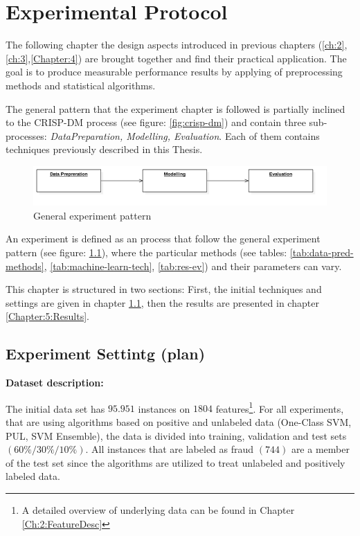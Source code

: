 \chapter{Experimental Protocol}\label{Chapter:5}

The following chapter the design aspects introduced in previous chapters (\ref{ch:2},\ref{ch:3},\ref{Chapter:4}) are brought together and find their practical application. The goal is to produce measurable performance results  by applying of  preprocessing methods and statistical algorithms.

The general pattern that the experiment chapter is followed is partially inclined to the CRISP-DM process (see figure: \ref{fig:crisp-dm}) and contain three sub-processes: \textit{DataPreparation, Modelling, Evaluation}. Each of them contains techniques previously described in this Thesis. 

\begin{figure}[h!]
    \centering
    \includegraphics[scale=0.5]{Graphics/DeploymentDiagram1.png}
    \caption{General experiment pattern} %
    \label{fig:dep-dia}
\end{figure}

An experiment is defined as an process that follow the general experiment pattern (see figure: \ref{fig:dep-dia}), where the particular methods (see tables: \ref{tab:data-pred-methods}, \ref{tab:machine-learn-tech}, \ref{tab:res-ev}) and their parameters can vary.

This chapter is structured in two sections: First, the initial techniques and settings are given in chapter \ref{ch:5:ES}, then the results are presented in chapter \ref{Chapter:5:Results}. 


\section{Experiment Settintg (plan)} \label{ch:5:ES}

\textbf{Dataset description:}

The initial data set has \(95.951\) instances on \(1804\) features\footnote{A detailed overview of underlying data can be found in Chapter \ref{Ch:2:FeatureDesc}}. 
For all experiments, that are using algorithms based on positive and unlabeled data (One-Class SVM, PUL, SVM Ensemble), the data is divided into training, validation and test sets \((60\%/30\%/10\%)\).  All instances that are labeled as fraud \((744)\) are a member of the test set since the algorithms are utilized to treat unlabeled and  positively labeled data. 

